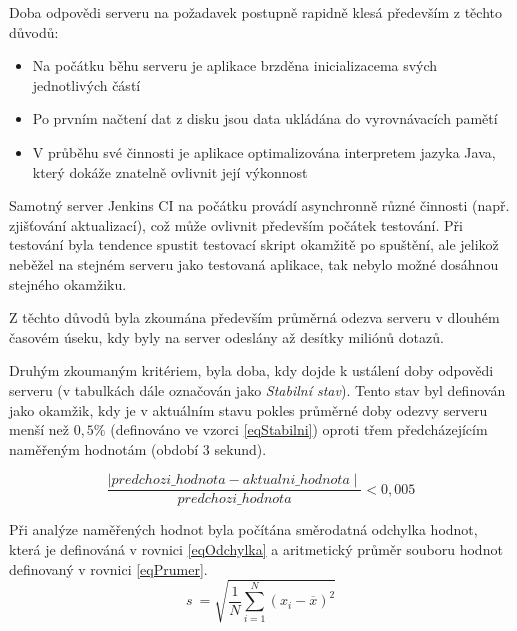             Doba odpovědi
            serveru na požadavek postupně rapidně klesá především z těchto důvodů:
            
            \begin{itemize}
                \item Na počátku běhu serveru je aplikace brzděna inicializacema svých jednotlivých částí
                \item Po prvním načtení dat z disku jsou data ukládána do vyrovnávacích pamětí
                \item V průběhu své činnosti je aplikace optimalizována interpretem jazyka Java,
                    který dokáže znatelně ovlivnit její výkonnost
            \end{itemize}

            Samotný server Jenkins CI na počátku provádí asynchronně různé činnosti (např. zjišťování aktualizací),
            což může ovlivnit především počátek testování. Při testování byla tendence spustit testovací 
            skript okamžitě po spuštění, ale jelikož neběžel na stejném serveru jako testovaná
            aplikace, tak nebylo možné dosáhnou stejného okamžiku. 

            \medskip
            Z těchto důvodů byla zkoumána především průměrná odezva serveru v dlouhém časovém
            úseku, kdy byly na server odeslány až desítky miliónů dotazů.

            Druhým zkoumaným kritériem, byla doba, kdy dojde k ustálení
            doby odpovědi serveru (v tabulkách dále označován jako \emph{Stabilní stav}).
            Tento stav byl definován jako okamžik, kdy je v aktuálním stavu
            pokles průměrné doby odezvy serveru 
            menší než $0,5\%$ (definováno ve vzorci \ref{eqStabilni})
            oproti třem předcházejícím naměřeným hodnotám (období 3 sekund).
            
            \begin{equation}\label{eqStabilni}
                \frac{\mid predchozi\_hodnota - aktualni\_hodnota\mid}{predchozi\_hodnota} < 0,005
            \end{equation}
            \medskip

        
            Při analýze naměřených hodnot byla počítána směrodatná odchylka hodnot, která je
            definováná v rovnici \ref{eqOdchylka} a aritmetický průměr souboru hodnot
            definovaný v rovnici \ref{eqPrumer}.
            \begin{equation}\label{eqOdchylka}
                s~= \sqrt{\frac{1}{N} \sum_{i=1}^N (x_i - \overline{x})^2}      
            \end{equation}

